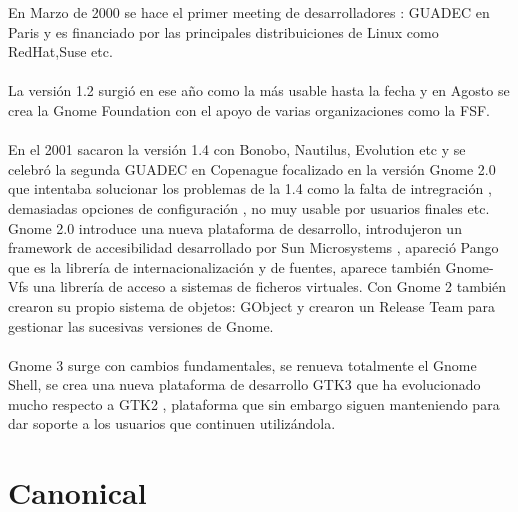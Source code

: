 \documentclass[a4paper,oneside,11pt]{article}
\begin{document}
En Marzo de 2000 se hace el primer meeting de desarrolladores : GUADEC en Paris y
es financiado por las principales distribuiciones de Linux como RedHat,Suse etc.
\\\\
La versi\'on 1.2 surgi\'o en ese año como la m\'as usable hasta la fecha y en Agosto se crea
la Gnome Foundation con el apoyo de varias organizaciones como la FSF.
\\\\
En el 2001 sacaron la versi\'on 1.4 con Bonobo, Nautilus, Evolution etc y se celebr\'o
la segunda GUADEC en Copenague focalizado en la versi\'on Gnome 2.0 que intentaba solucionar
los problemas de la 1.4 como la falta de intregraci\'on , demasiadas opciones de configuraci\'on
, no muy usable por usuarios finales etc. Gnome 2.0 introduce una nueva plataforma de
desarrollo, introdujeron un framework de accesibilidad desarrollado por Sun Microsystems
, apareci\'o Pango que es la librer\'ia de internacionalizaci\'on y de fuentes,
aparece tambi\'en Gnome-Vfs una librer\'ia de acceso a sistemas de ficheros virtuales. 
Con Gnome 2 tambi\'en crearon su propio sistema de objetos: GObject y crearon un
Release Team para gestionar las sucesivas versiones de Gnome.
\\\\
Gnome 3 surge con cambios fundamentales, se renueva totalmente el Gnome Shell, 
se crea una nueva plataforma de desarrollo GTK3 que ha evolucionado mucho respecto
a GTK2 , plataforma que sin embargo siguen manteniendo para dar soporte a los usuarios
que continuen utiliz\'andola. 

\section{Canonical}
\end{document}
